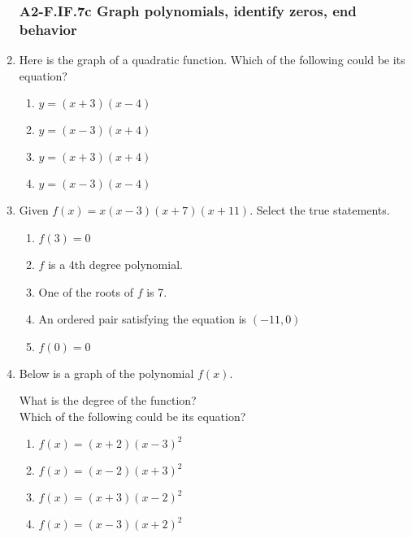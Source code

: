 \documentclass[12pt, twoside]{article}
\begin{document}
\begin{enumerate}
\subsubsection*{A2-F.IF.7c Graph polynomials, identify zeros, end behavior}
\item Here is the graph of a quadratic function. Which of the following could be its equation?
\begin{multicols}{2}
    \begin{enumerate}
        \item $y=(x+3)(x-4)$
        \item $y=(x-3)(x+4)$
        \item $y=(x+3)(x+4)$
        \item $y=(x-3)(x-4)$
    \end{enumerate} \vspace{1cm} \;

    \columnbreak
    \end{multicols}

\newpage
\item Given $f(x) = x(x-3)(x+7)(x+11)$. Select the true statements.
    \begin{enumerate}
    \item $f(3)=0$
    \item $f$ is a 4th degree polynomial.
    \item One of the roots of $f$ is 7.
    \item An ordered pair satisfying the equation is $(-11,0)$
    \item $f(0)=0$
    \end{enumerate}

\item Below is a graph of the polynomial $f(x)$. 
\begin{multicols}{2}
    What is the degree of the function?\\[1cm]
    Which of the following could be its equation?
    \begin{enumerate}
        \item $f(x)=(x+2)(x-3)^2$
        \item $f(x)=(x-2)(x+3)^2$
        \item $f(x)=(x+3)(x-2)^2$
        \item $f(x)=(x-3)(x+2)^2$
    \end{enumerate} \vspace{1cm} \;


\end{multicols}
\end{enumerate}
\end{document}
